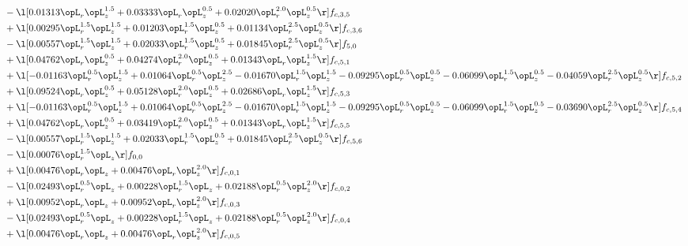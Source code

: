 \begin{alignat}{2}
& - \l[  0.01313 \opL_r \opL_z^{1.5} +  0.03333 \opL_r \opL_z^{0.5} +  0.02020 \opL_r^{2.0} \opL_z^{0.5}  \r] f_{c,3,5} \nonumber \\ 
& + \l[  0.00295 \opL_r^{1.5} \opL_z^{1.5} +  0.01203 \opL_r^{1.5} \opL_z^{0.5} +  0.01134 \opL_r^{2.5} \opL_z^{0.5}  \r] f_{c,3,6} \nonumber \\ 
& - \l[  0.00557 \opL_r^{1.5} \opL_z^{1.5} +  0.02033 \opL_r^{1.5} \opL_z^{0.5} +  0.01845 \opL_r^{2.5} \opL_z^{0.5}  \r] f_{5,0} \nonumber \\ 
& + \l[  0.04762 \opL_r \opL_z^{0.5} +  0.04274 \opL_r^{2.0} \opL_z^{0.5} +  0.01343 \opL_r \opL_z^{1.5}  \r] f_{c,5,1} \nonumber \\ 
& + \l[  -0.01163 \opL_r^{0.5} \opL_z^{1.5} +  0.01064 \opL_r^{0.5} \opL_z^{2.5}   -0.01670 \opL_r^{1.5} \opL_z^{1.5}   -0.09295 \opL_r^{0.5} \opL_z^{0.5}   -0.06099 \opL_r^{1.5} \opL_z^{0.5}   -0.04059 \opL_r^{2.5} \opL_z^{0.5}  \r] f_{c,5,2} \nonumber \\ 
& + \l[  0.09524 \opL_r \opL_z^{0.5} +  0.05128 \opL_r^{2.0} \opL_z^{0.5} +  0.02686 \opL_r \opL_z^{1.5}  \r] f_{c,5,3} \nonumber \\ 
& + \l[  -0.01163 \opL_r^{0.5} \opL_z^{1.5} +  0.01064 \opL_r^{0.5} \opL_z^{2.5}   -0.01670 \opL_r^{1.5} \opL_z^{1.5}   -0.09295 \opL_r^{0.5} \opL_z^{0.5}   -0.06099 \opL_r^{1.5} \opL_z^{0.5}   -0.03690 \opL_r^{2.5} \opL_z^{0.5}  \r] f_{c,5,4} \nonumber \\ 
& + \l[  0.04762 \opL_r \opL_z^{0.5} +  0.03419 \opL_r^{2.0} \opL_z^{0.5} +  0.01343 \opL_r \opL_z^{1.5}  \r] f_{c,5,5} \nonumber \\ 
& - \l[  0.00557 \opL_r^{1.5} \opL_z^{1.5} +  0.02033 \opL_r^{1.5} \opL_z^{0.5} +  0.01845 \opL_r^{2.5} \opL_z^{0.5}  \r] f_{c,5,6} \nonumber \\ 
& - \l[  0.00076 \opL_r^{1.5} \opL_z  \r] f_{0,0} \nonumber \\ 
& + \l[  0.00476 \opL_r \opL_z +  0.00476 \opL_r \opL_z^{2.0}  \r] f_{c,0,1} \nonumber \\ 
& - \l[  0.02493 \opL_r^{0.5} \opL_z +  0.00228 \opL_r^{1.5} \opL_z +  0.02188 \opL_r^{0.5} \opL_z^{2.0}  \r] f_{c,0,2} \nonumber \\ 
& + \l[  0.00952 \opL_r \opL_z +  0.00952 \opL_r \opL_z^{2.0}  \r] f_{c,0,3} \nonumber \\ 
& - \l[  0.02493 \opL_r^{0.5} \opL_z +  0.00228 \opL_r^{1.5} \opL_z +  0.02188 \opL_r^{0.5} \opL_z^{2.0}  \r] f_{c,0,4} \nonumber \\ 
& + \l[  0.00476 \opL_r \opL_z +  0.00476 \opL_r \opL_z^{2.0}  \r] f_{c,0,5} \nonumber \\ 

\end{alignat}
